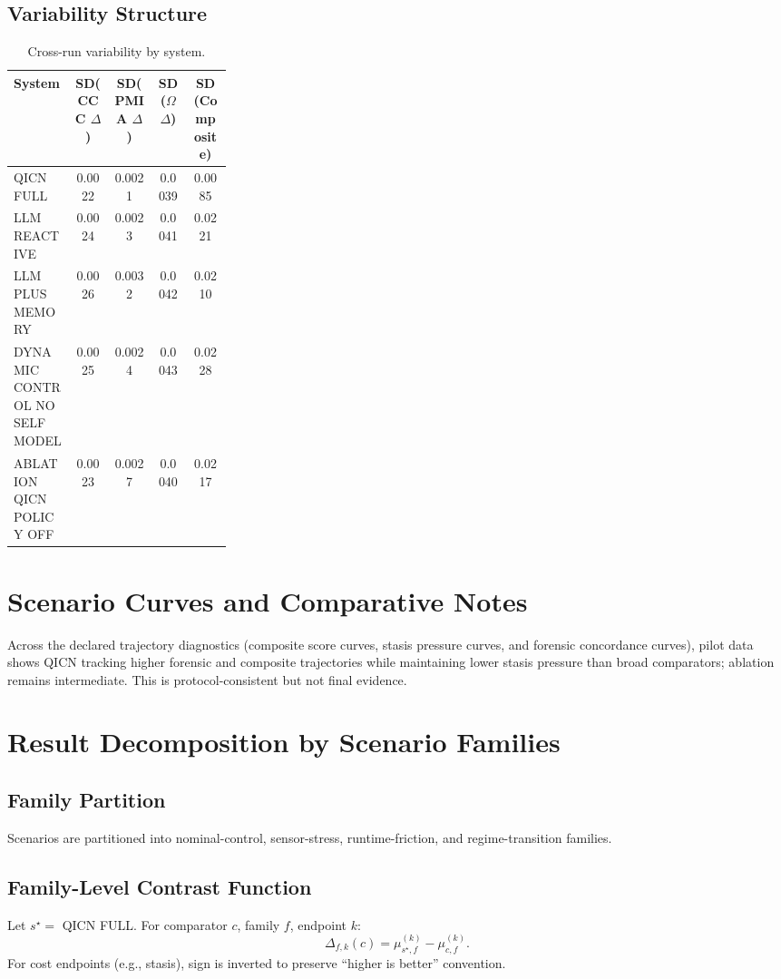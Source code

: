 \documentclass[11pt,a4paper]{article}
\theoremstyle{definition}
\begin{document}
\subsection{Variability Structure}
\begin{table}[!htbp]
\centering
\setlength{\tabcolsep}{3pt}
\begin{tabular}{>{\raggedright\arraybackslash}p{0.28\linewidth}cccc}
\toprule
System & SD(CCC $\Delta$) & SD(PMIA $\Delta$) & SD($\Omega$ $\Delta$) & \shortstack{SD\\(Composite)} \\
\midrule
QICN FULL & 0.0022 & 0.0021 & 0.0039 & 0.0085 \\
LLM REACTIVE & 0.0024 & 0.0023 & 0.0041 & 0.0221 \\
LLM PLUS MEMORY & 0.0026 & 0.0032 & 0.0042 & 0.0210 \\
DYNAMIC CONTROL NO SELF MODEL & 0.0025 & 0.0024 & 0.0043 & 0.0228 \\
ABLATION QICN POLICY OFF & 0.0023 & 0.0027 & 0.0040 & 0.0217 \\
\bottomrule
\end{tabular}
\caption{Cross-run variability by system.}
\end{table}

\section{Scenario Curves and Comparative Notes}
Across the declared trajectory diagnostics (composite score curves, stasis pressure curves, and forensic concordance curves), pilot data shows QICN tracking higher forensic and composite trajectories while maintaining lower stasis pressure than broad comparators; ablation remains intermediate. This is protocol-consistent but not final evidence.

\section{Result Decomposition by Scenario Families}
\subsection{Family Partition}
Scenarios are partitioned into nominal-control, sensor-stress, runtime-friction, and regime-transition families.

\subsection{Family-Level Contrast Function}
Let $s^\star =$ QICN FULL. For comparator $c$, family $f$, endpoint $k$:
\[
\Delta_{f,k}(c)=\mu^{(k)}_{s^\star,f}-\mu^{(k)}_{c,f}.
\]
For cost endpoints (e.g., stasis), sign is inverted to preserve ``higher is better'' convention.
\end{document}
